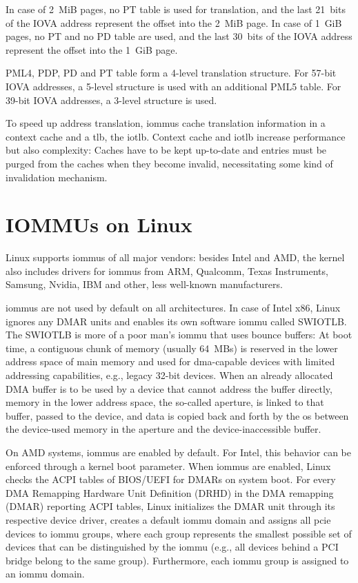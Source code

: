 In case of 2~MiB pages, no PT table is used for translation, and the last
21~bits of the IOVA address represent the offset into the 2~MiB page. In case of
1~GiB pages, no PT and no PD table are used, and the last 30~bits of the IOVA
address represent the offset into the 1~GiB page.

PML4, PDP, PD and PT table form a 4-level translation structure. For 57-bit IOVA
addresses, a 5-level structure is used with an additional PML5 table. For 39-bit
IOVA addresses, a 3-level structure is used.

To speed up address translation, \acp{iommu} cache translation information in a
context cache and a \ac{tlb}, the \ac{iotlb}. Context cache and \ac{iotlb}
increase performance but also complexity: Caches have to be kept up-to-date and
entries must be purged from the caches when they become invalid, necessitating
some kind of invalidation mechanism.


\section{IOMMUs on Linux}
\label{sec:iommus_on_linux}

Linux supports \acp{iommu} of all major vendors: besides Intel and AMD, the
kernel also includes drivers for \acp{iommu} from ARM, Qualcomm, Texas
Instruments, Samsung, Nvidia, IBM and other, less well-known manufacturers.

\acp{iommu} are not used by default on all architectures. In case of Intel x86,
Linux ignores any DMAR units and enables its own software \ac{iommu} called
SWIOTLB. The SWIOTLB is more of a poor man's \ac{iommu} that uses bounce
buffers: At boot time, a contiguous chunk of memory (usually 64~MBs) is reserved
in the lower address space of main memory and used for \ac{dma}-capable devices
with limited addressing capabilities, e.g., legacy 32-bit devices. When an
already allocated DMA buffer is to be used by a device that cannot address the
buffer directly, memory in the lower address space, the so-called aperture, is
linked to that buffer, passed to the device, and data is copied back and forth
by the \ac{os} between the device-used memory in the aperture and the
device-inaccessible buffer.

On AMD systems, \acp{iommu} are enabled by default. For Intel, this behavior can
be enforced through a kernel boot parameter. When \acp{iommu} are enabled, Linux
checks the ACPI tables of BIOS/UEFI for DMARs on system boot. For every DMA
Remapping Hardware Unit Definition (DRHD) in the DMA remapping (DMAR) reporting
ACPI tables, Linux initializes the DMAR unit through its respective device
driver, creates a default \ac{iommu} domain and assigns all \ac{pcie} devices to
\ac{iommu} groups, where each group represents the smallest possible set of
devices that can be distinguished by the \ac{iommu} (e.g., all devices behind a
PCI bridge belong to the same group). Furthermore, each \ac{iommu} group is
assigned to an \ac{iommu} domain.

